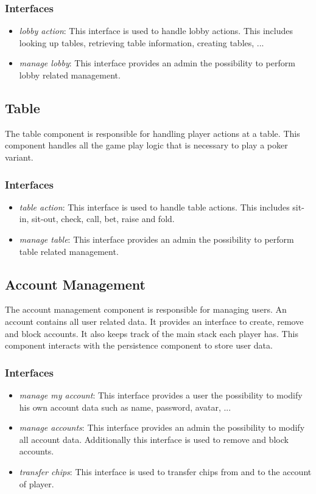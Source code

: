 \documentclass[a4paper,11pt]{report}
\begin{document}
\subsubsection{Interfaces}
\begin{itemize}
\item \emph{lobby action}: This interface is used to handle lobby actions. This includes looking up tables, retrieving table information, creating tables, ...
\item \emph{manage lobby}: This interface provides an admin the possibility to perform lobby related management.
\end{itemize}

\subsection{Table}
The table component is responsible for handling player actions at a table. This component handles all the game play logic that is necessary to play a poker variant.
\subsubsection{Interfaces}
\begin{itemize}
\item \emph{table action}: This interface is used to handle table actions. This includes sit-in, sit-out, check,  call, bet, raise and fold.
\item \emph{manage table}: This interface provides an admin the possibility to perform table related management.
\end{itemize}

\subsection{Account Management}
The account management component is responsible for managing users. An account contains all user related data. It provides an interface to create, remove and block accounts. It also keeps track of the main stack each player has. This component interacts with the persistence component to store user data.
\subsubsection{Interfaces}
\begin{itemize}
\item \emph{manage my account}: This interface provides a user the possibility to modify his own account data such as name, password, avatar, ...
\item \emph{manage accounts}: This interface provides an admin the possibility to modify all account data. Additionally this interface is used to remove and block accounts. 
\item \emph{transfer chips}: This interface is used to transfer chips from and to the account of player.
\end{itemize}
\end{document}
